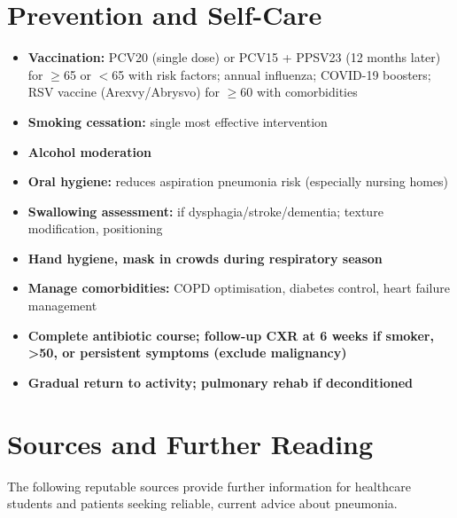 \section*{Prevention and Self-Care}
\begin{itemize}
    \item \textbf{Vaccination:} PCV20 (single dose) or PCV15 + PPSV23 (12 months later) for $\ge$65 or $<$65 with risk factors; annual influenza; COVID-19 boosters; RSV vaccine (Arexvy/Abrysvo) for $\ge$60 with comorbidities
    \item \textbf{Smoking cessation:} single most effective intervention
    \item \textbf{Alcohol moderation}
    \item \textbf{Oral hygiene:} reduces aspiration pneumonia risk (especially nursing homes)
    \item \textbf{Swallowing assessment:} if dysphagia/stroke/dementia; texture modification, positioning
    \item \textbf{Hand hygiene, mask in crowds during respiratory season}
    \item \textbf{Manage comorbidities:} COPD optimisation, diabetes control, heart failure management
    \item \textbf{Complete antibiotic course; follow-up CXR at 6 weeks if smoker, >50, or persistent symptoms (exclude malignancy)}
    \item \textbf{Gradual return to activity; pulmonary rehab if deconditioned}
\end{itemize}

\section*{Sources and Further Reading}
The following reputable sources provide further information for healthcare students and patients seeking reliable, current advice about pneumonia.

